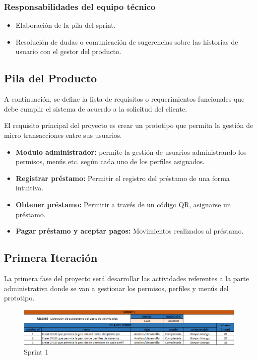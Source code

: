 {{		\subsubsection{Responsabilidades del equipo técnico}
			\begin{itemize}
				\item Elaboración de la pila del sprint.
				\item Resolución de dudas o comunicación de sugerencias sobre las historias de usuario con el gestor del producto.
			\end{itemize}
	}

	\subsection{Pila del Producto}
	{A continuación, se define la lista de requisitos o requerimientos funcionales que debe cumplir el sistema de acuerdo a la solicitud del cliente.
		
	El requisito principal del proyecto es crear un prototipo que permita la gestión de micro transacciones entre sus usuarios.\\
		
		\begin{itemize}
			\item \textbf{Modulo administrador:} permite la gestión de usuarios administrando los permisos, menús etc. según cada uno de los perfiles asignados.
			\item \textbf{Registrar préstamo:} Permitir el registro del préstamo de una forma intuitiva.
			\item \textbf{Obtener préstamo:} Permitir a través de un código QR, asignarse un préstamo.
			\item \textbf{Pagar préstamo y aceptar pagos:} Movimientos realizados al préstamo.
		\end{itemize}
	
	}

	\subsection{Primera Iteración}
	{La primera fase del proyecto será desarrollar las actividades referentes a la parte administrativa donde se van a gestionar los permisos, perfiles y menús del prototipo.\\
	
	\begin{figure}[H]
			\centering
			\includegraphics[width=1\linewidth]{development/sprint1.png}
			\caption{Sprint 1}
	\end{figure}

}}
